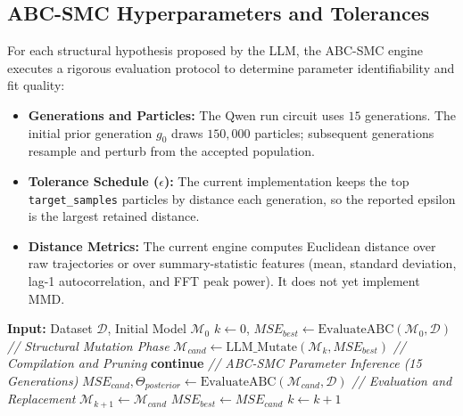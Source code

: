 \subsection{ABC-SMC Hyperparameters and Tolerances}
For each structural hypothesis proposed by the LLM, the ABC-SMC engine executes a rigorous evaluation protocol to determine parameter identifiability and fit quality:
\begin{itemize}
    \item \textbf{Generations and Particles:} The Qwen run circuit uses $15$ generations. The initial prior generation $g_0$ draws $150,000$ particles; subsequent generations resample and perturb from the accepted population.
    \item \textbf{Tolerance Schedule ($\epsilon$):} The current implementation keeps the top \texttt{target\_samples} particles by distance each generation, so the reported epsilon is the largest retained distance.
    \item \textbf{Distance Metrics:} The current engine computes Euclidean distance over raw trajectories or over summary-statistic features (mean, standard deviation, lag-1 autocorrelation, and FFT peak power). It does not yet implement MMD.
\end{itemize}

\begin{algorithm}
\caption{$E^3$ Meta-Contemplation Loop}
\begin{algorithmic}[1]
\State \textbf{Input:} Dataset $\mathcal{D}$, Initial Model $\mathcal{M}_0$
\State $k \gets 0$, $MSE_{best} \gets \text{EvaluateABC}(\mathcal{M}_0, \mathcal{D})$
    \State \textit{// Structural Mutation Phase}
    \State $\mathcal{M}_{cand} \gets \text{LLM\_Mutate}(\mathcal{M}_k, MSE_{best})$
    \State \textit{// Compilation and Pruning}
        \State \textbf{continue}
    \EndIf
    \State \textit{// ABC-SMC Parameter Inference (15 Generations)}
    \State $MSE_{cand}, \Theta_{posterior} \gets \text{EvaluateABC}(\mathcal{M}_{cand}, \mathcal{D})$
    \State \textit{// Evaluation and Replacement}
        \State $\mathcal{M}_{k+1} \gets \mathcal{M}_{cand}$
        \State $MSE_{best} \gets MSE_{cand}$
        \State $k \gets k + 1$
    \EndIf
\EndWhile
\end{algorithmic}
\end{algorithm}

